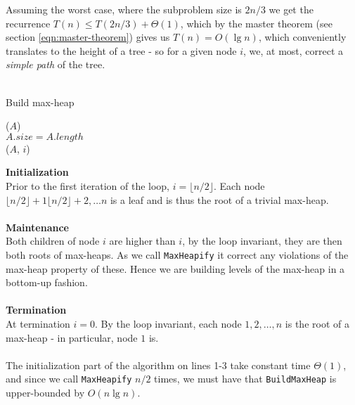 Assuming the worst case, where the subproblem size is $2n/3$ we get the
recurrence $T(n) \leq T(2n/3) + \Theta(1)$, which by the master theorem (see
section \ref{eqn:master-theorem}) gives us $T(n) = O(\lg n)$, which
conveniently translates to the height of a tree - so for a given node $i$, we,
at most, correct a \textit{simple path} of the tree.
\\\\
\begin{algorithm}[H]
	\caption{Build max-heap}
	\label{alg:build-max-heap}





	\BlankLine
	\BuildMaxHeap($A$) \\
	\Begin
	{
		$A.size = A.length$ \\
		{
			\MaxHeapify($A$, $i$)
		}
	}
\end{algorithm}
\noindent \textbf{Initialization} \\
Prior to the first iteration of the loop, $i = \lfloor n/2 \rfloor$. Each node
$\lfloor n/2 \rfloor + 1 \lfloor n/2 \rfloor + 2, \dots n$ is a leaf and is
thus the root of a trivial max-heap.
\\\\
\noindent \textbf{Maintenance} \\
Both children of node $i$ are higher than $i$, by the loop invariant, they are
then both roots of max-heaps. As we call \texttt{MaxHeapify} it correct any
violations of the max-heap property of these. Hence we are building levels of
the max-heap in a bottom-up fashion.
\\\\
\noindent \textbf{Termination} \\
At termination $i = 0$. By the loop invariant, each node $1, 2, \dots, n$ is
the root of a max-heap - in particular, node $1$ is.
\\\\
The initialization part of the algorithm on lines 1-3 take constant time
$\Theta(1)$, and since we call \texttt{MaxHeapify} $n/2$ times, we must have
that \texttt{BuildMaxHeap} is upper-bounded by $O(n \lg n)$.

